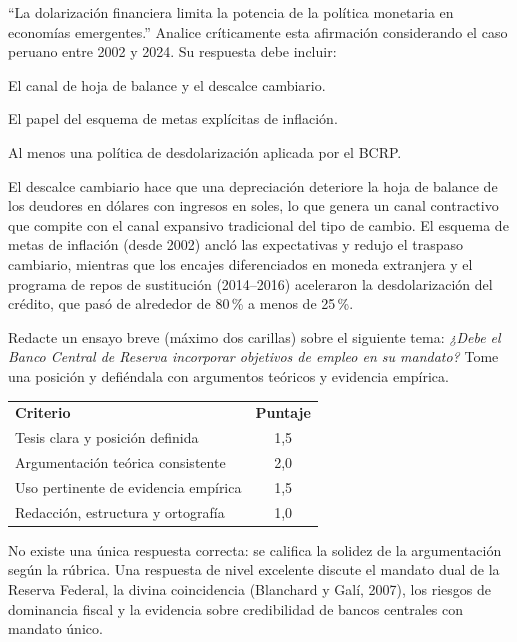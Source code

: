 \documentclass{academic-exam}
\begin{document}
\begin{pregunta}[6]
\enquote{La dolarización financiera limita la potencia de la política
monetaria en economías emergentes.} Analice críticamente esta afirmación
considerando el caso peruano entre 2002 y 2024. Su respuesta debe incluir:
\begin{apartados}
  \item El canal de hoja de balance y el descalce cambiario. 
  \item El papel del esquema de metas explícitas de inflación. 
  \item Al menos una política de desdolarización aplicada por el BCRP. 
\end{apartados}
\begin{solucion}
El descalce cambiario hace que una depreciación deteriore la hoja de
balance de los deudores en dólares con ingresos en soles, lo que genera un
canal contractivo que compite con el canal expansivo tradicional del tipo
de cambio. El esquema de metas de inflación (desde 2002) ancló las
expectativas y redujo el traspaso cambiario, mientras que los encajes
diferenciados en moneda extranjera y el programa de repos de sustitución
(2014--2016) aceleraron la desdolarización del crédito, que pasó de
alrededor de 80\,\% a menos de 25\,\%.
\end{solucion}
\end{pregunta}

\begin{pregunta}[6]
Redacte un ensayo breve (máximo dos carillas) sobre el siguiente tema:
\emph{¿Debe el Banco Central de Reserva incorporar objetivos de empleo en
su mandato?} Tome una posición y defiéndala con argumentos teóricos y
evidencia empírica.

\begin{criterios}
\begin{tabularx}{\linewidth}{@{}X c@{}}
  \textbf{Criterio} & \textbf{Puntaje}\\
  \arrayrulecolor{grislinea}\hline\addlinespace[3pt]
  Tesis clara y posición definida            & 1{,}5 \\
  Argumentación teórica consistente          & 2{,}0 \\
  Uso pertinente de evidencia empírica       & 1{,}5 \\
  Redacción, estructura y ortografía         & 1{,}0 \\
\end{tabularx}
\end{criterios}
\begin{solucion}
No existe una única respuesta correcta: se califica la solidez de la
argumentación según la rúbrica. Una respuesta de nivel excelente discute
el mandato dual de la Reserva Federal, la divina coincidencia
(Blanchard y Galí, 2007), los riesgos de dominancia fiscal y la evidencia
sobre credibilidad de bancos centrales con mandato único.
\end{solucion}
\end{pregunta}

\findelexamen
\end{document}
